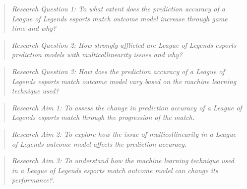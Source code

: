 \begin{quote}  \emph{Research Question 1: To what extent does the prediction accuracy of a League of Legends esports match outcome model increase through game time and why?} \end{quote}

\begin{quote}  \emph{Research Question 2: How strongly afflicted are League of Legends esports prediction models with multicollinearity issues and why?} \end{quote}

\begin{quote}  \emph{Research Question 3: How does the prediction accuracy of a League of Legends esports match outcome model vary based on the machine learning technique used?} \end{quote}

\begin{quote}  \emph{Research Aim 1: To assess the change in prediction accuracy of a League of Legends esports match through the progression of the match.} \end{quote}

\begin{quote}  \emph{Research Aim 2: To explore how the issue of multicollinearity in a League of Legends outcome model affects the prediction accuracy.} \end{quote}

\begin{quote}  \emph{Research Aim 3: To understand how the machine learning technique used in a League of Legends esports match outcome model can change its performance?.} \end{quote}